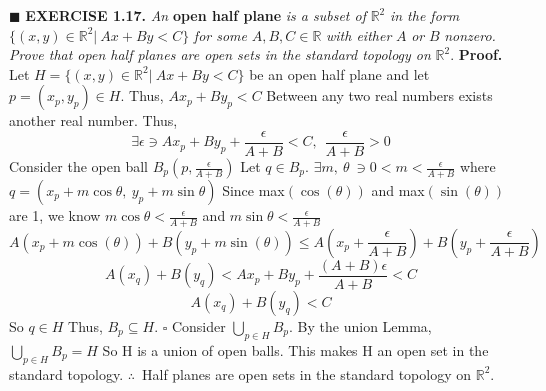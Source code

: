 \documentclass[12pt]{article}
\begin{document}
	\newline \(\blacksquare\) \newline
	\newpage
	\noindent
	\textbf{EXERCISE 1.17.} \textit{An} \textbf{open half plane} \textit{is a subset of }\(\mathbb{R}^2\) \textit{in the form} \(\{(x,y) \in \mathbb{R}^2|\ Ax + By < C\}\) \textit{for some} \(A,B,C \in \mathbb{R}\) \textit{with either} \(A\) \textit{or} \(B\)
	\textit{nonzero. Prove that open half planes are open sets in the standard topology on} \(\mathbb{R}^2\). \newline \newline
	\textbf{Proof.} \newline
	Let \(H = \{(x,y) \in \mathbb{R}^2|\ Ax + By < C\}\) be an open half plane and let \(p = (x_p,y_p) \in H\).
	\newline
	Thus, \(Ax_p + By_p < C\) \newline
	Between any two real numbers exists another real number. Thus,
	\[\exists \epsilon \ni Ax_p + By_p + \frac{\epsilon}{A+B} < C,\ \ \frac{\epsilon}{A+B} > 0\]
	Consider the open ball \(B_p(p, \frac{\epsilon}{A+B})\)
	\newline
	Let \(q \in B_p\). \newline \newline
	\(\exists m,\ \theta\  \ni 0< m <\frac{\epsilon}{A+B}\) where \(q=(x_p+m\cos \theta,\  y_p+m\sin \theta)\) \newline
	Since max\((\cos(\theta))\) and max\((\sin(\theta))\) are 1, we know
	\newline \(m\cos \theta < \frac{\epsilon}{A+B}\) and \(m\sin \theta < \frac{\epsilon}{A+B}\)
	\newline
	\[A(x_p + m\cos(\theta)) + B(y_p + m\sin(\theta)) \leq A(x_p + \frac{\epsilon}{A+B}) + B(y_p + \frac{\epsilon}{A+B})\]
	\[A(x_q) + B(y_q) < Ax_p + By_p + \frac{(A+B)\epsilon}{A+B} < C\]
	\[A(x_q) + B(y_q) < C\]
	So \(q \in H\) \newline
	Thus, \(B_p \subseteq H\).
	\newline \(\square\) \newline
	Consider \(\bigcup_{p \in H}B_p\). \newline \newline
	By the union Lemma, \(\bigcup_{p \in H}B_p = H\)
	\newline
	So H is a union of open balls. \newline
	This makes H an open set in the standard topology.
	\newline \newline
	\(\therefore\)\ Half planes are open sets in the standard topology on \(\mathbb{R}^2\).
\end{document}
